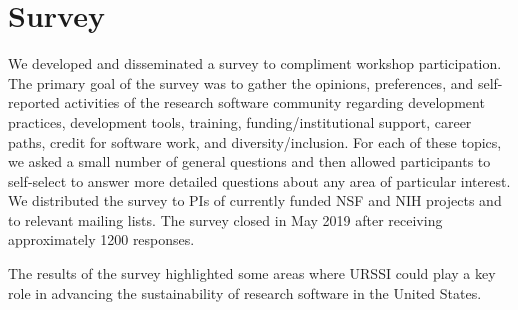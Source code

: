 \documentclass[
]{book}
\begin{document}
\hypertarget{survey}{%
\section{Survey}\label{survey}}

We developed and disseminated a survey to compliment workshop participation.
The primary goal of the survey was to gather the opinions, preferences, and
self-reported activities of the research software community regarding
development practices, development tools, training, funding/institutional
support, career paths, credit for software work, and diversity/inclusion.
For each of these topics, we asked a small number of general questions and
then allowed participants to self-select to answer more detailed questions
about any area of particular interest. We distributed the survey to PIs of
currently funded NSF and NIH projects and to relevant mailing lists. The
survey closed in May 2019 after receiving approximately 1200 responses.

The results of the survey highlighted some areas where URSSI could play a
key role in advancing the sustainability of research software in the United States.
\end{document}
